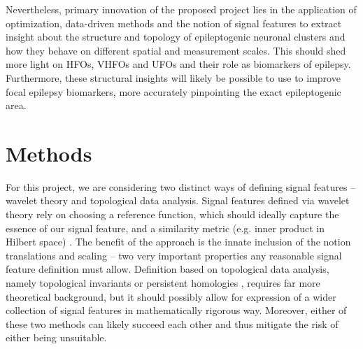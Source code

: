 \documentclass[a4paper,11pt]{scrartcl}
\begin{document}
Nevertheless, primary innovation of the proposed project lies in the application of optimization, data-driven methods and the notion of signal features to extract insight about the structure and topology of epileptogenic neuronal clusters and how they behave on different spatial and measurement scales. This should shed more light on HFOs, VHFOs and UFOs and their role as biomarkers of epilepsy. Furthermore, these structural insights will likely be possible to use to improve focal epilepsy biomarkers, more accurately pinpointing the exact epileptogenic area.



\section{Methods}\label{sec:methods}

For this project, we are considering two distinct ways of defining signal features -- wavelet theory and topological data analysis. Signal features defined via wavelet theory rely on choosing a reference function, which should ideally capture the essence of our signal feature, and a similarity metric (e.g. inner product in Hilbert space) \cite{Ganjalizadeh2022, Brochard2022, Rocha2011}. The benefit of the approach is the innate inclusion of the notion translations and scaling \cite{Mallat2009} -- two very important properties any reasonable signal feature definition must allow. Definition based on topological data analysis, namely topological invariants or persistent homologies \cite{Carriere2021, Myers2022}, requires far more theoretical background, but it should possibly allow for expression of a wider collection of signal features in mathematically rigorous way. Moreover, either of these two methods can likely succeed each other and thus mitigate the risk of either being unsuitable.
\end{document}
